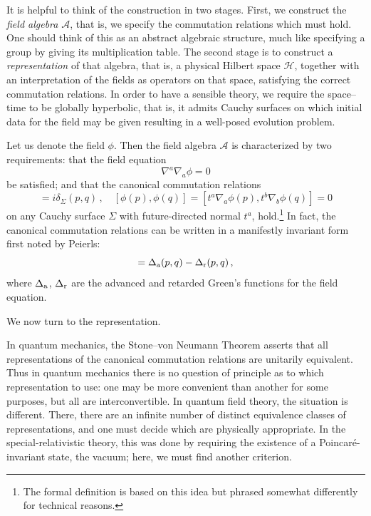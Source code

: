 \documentclass[
%
draft    %
,numberedheadings 
,bibliocites
  ]
  {aipproc}
\newcommand{\A}{{\mathcal A}}
\newcommand{\HH}{{\mathcal H}}
\begin{document}
It is helpful to think of the construction in two stages.  First, we construct the {\em field algebra} $\A$, that is, we specify the commutation relations which must hold.  One should think of this as an abstract algebraic structure, much like specifying a group by giving its multiplication table.  The second stage is to construct a {\em representation} of that algebra, that is, a physical Hilbert space $\HH$, together with an interpretation of the fields as
operators on that space, satisfying the correct commutation relations.
In order to have a sensible theory, we require the space--time to be globally hyperbolic, that is, it admits Cauchy surfaces on which initial data for the field may be given resulting in a
 well-posed evolution problem. 

Let us denote the field $\phi$.  Then the field algebra $\A$ is characterized by two requirements:  that the field equation
\begin{equation}
  \nabla ^a\nabla _a\phi =0
\end{equation}
be satisfied; and that the canonical commutation relations
\begin{equation}
  [t^a\nabla _a\phi (p),\phi (q)] =i\delta _\Sigma (p,q)\, ,\quad
 [\phi (p),\phi (q)]=[t^a\nabla _a\phi (p),t^b\nabla _b\phi (q)]=0
\end{equation}
on any Cauchy surface $\Sigma$ with
future-directed normal $t^a$, hold.\footnote{The formal definition is based on this idea but phrased somewhat differently for technical reasons.}  In fact, the canonical commutation relations can be written in a manifestly invariant form first noted by Peierls:
\begin{equation}
  [\phi (p),\phi (q)] = \Delta _{\rm a}(p,q) -\Delta _{\rm r}(p,q)\, ,
\end{equation}
where $\Delta _{\rm a}$, $\Delta _{\rm r}$ are the advanced and retarded Green's functions for the field equation.

We now turn to the representation.
 


In quantum mechanics, the Stone--von Neumann Theorem asserts that all representations of the canonical commutation relations are unitarily equivalent.  Thus in quantum mechanics there is no question of principle as to which representation to use:  one may be more convenient than another for some purposes, but all are interconvertible.
In quantum field theory, the situation is different.  There, there are an infinite number of distinct equivalence classes of representations, and one must decide which are physically appropriate.  In the special-relativistic theory, this was done by requiring the existence of a Poincar\'e-invariant state, the vacuum; here, we must find another criterion.
\end{document}
